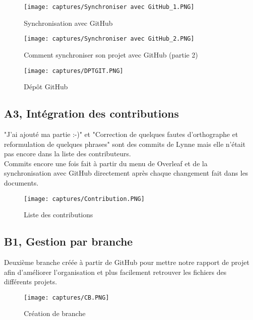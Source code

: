\documentclass{article}
\begin{document}
\begin{figure}[H]
    \centering
    \texttt{[image: captures/Synchroniser avec GitHub\_1.PNG]}
    \caption{Synchronisation avec GitHub}
    \label{Synch1}
\end{figure}

\begin{figure}[H]
    \centering
    \texttt{[image: captures/Synchroniser avec GitHub\_2.PNG]}
    \caption{Comment synchroniser son projet avec GitHub (partie 2)}
    \label{synch2}
\end{figure}

\begin{figure}[H]
    \centering
    \texttt{[image: captures/DPTGIT.PNG]}
    \caption{Dépôt GitHub}
    \label{DPTGit}
\end{figure}

\subsection{A3, Intégration des contributions}
"J'ai ajouté ma partie :-)" et "Correction de quelques fautes d'orthographe et reformulation de quelques phrases" sont des commits de Lynne mais elle n'était pas encore dans la liste des contributeurs.\\

Commits encore une fois fait à partir du menu de Overleaf et de la synchronisation avec GitHub directement après chaque changement fait dans les documents.

\begin{figure}[H]
    \centering
    \texttt{[image: captures/Contribution.PNG]}
    \caption{Liste des contributions}
    \label{Contrib}
\end{figure}

\subsection{B1, Gestion par branche}

Deuxième branche créée à partir de GitHub pour mettre notre rapport de projet afin d'améliorer l'organisation et plus facilement retrouver les fichiers des différents projets.

\begin{figure}[H]
    \centering
    \texttt{[image: captures/CB.PNG]}
    \caption{Création de branche}
    \label{CB}
\end{figure}
\end{document}
